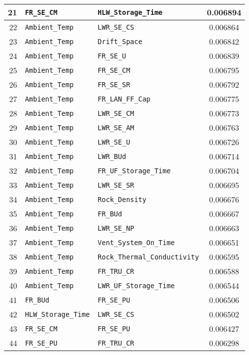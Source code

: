 \begin{center}
\begin{table}[htbp]
\begin{center}
\begin{tabular}{|r|l|l|c|}
\hline
21&\texttt{FR\_SE\_CM}&\texttt{HLW\_Storage\_Time}&0.006894\\
\hline
22&\texttt{Ambient\_Temp}&\texttt{LWR\_SE\_CS}&0.006864\\
\hline
23&\texttt{Ambient\_Temp}&\texttt{Drift\_Space}&0.006842\\
\hline
24&\texttt{Ambient\_Temp}&\texttt{FR\_SE\_U}&0.006839\\
\hline
25&\texttt{Ambient\_Temp}&\texttt{FR\_SE\_CM}&0.006795\\
\hline
26&\texttt{Ambient\_Temp}&\texttt{FR\_SE\_SR}&0.006792\\
\hline
27&\texttt{Ambient\_Temp}&\texttt{FR\_LAN\_FF\_Cap}&0.006775\\
\hline
28&\texttt{Ambient\_Temp}&\texttt{LWR\_SE\_CM}&0.006773\\
\hline
29&\texttt{Ambient\_Temp}&\texttt{LWR\_SE\_AM}&0.006763\\
\hline
30&\texttt{Ambient\_Temp}&\texttt{LWR\_SE\_U}&0.006726\\
\hline
31&\texttt{Ambient\_Temp}&\texttt{LWR\_BUd}&0.006714\\
\hline
32&\texttt{Ambient\_Temp}&\texttt{FR\_UF\_Storage\_Time}&0.006704\\
\hline
33&\texttt{Ambient\_Temp}&\texttt{LWR\_SE\_SR}&0.006695\\
\hline
34&\texttt{Ambient\_Temp}&\texttt{Rock\_Density}&0.006676\\
\hline
35&\texttt{Ambient\_Temp}&\texttt{FR\_BUd}&0.006667\\
\hline
36&\texttt{Ambient\_Temp}&\texttt{LWR\_SE\_NP}&0.006663\\
\hline
37&\texttt{Ambient\_Temp}&\texttt{Vent\_System\_On\_Time}&0.006651\\
\hline
38&\texttt{Ambient\_Temp}&\texttt{Rock\_Thermal\_Conductivity}&0.006595\\
\hline
39&\texttt{Ambient\_Temp}&\texttt{FR\_TRU\_CR}&0.006588\\
\hline
40&\texttt{Ambient\_Temp}&\texttt{LWR\_UF\_Storage\_Time}&0.006544\\
\hline
41&\texttt{FR\_BUd}&\texttt{FR\_SE\_PU}&0.006506\\
\hline
42&\texttt{HLW\_Storage\_Time}&\texttt{LWR\_SE\_CS}&0.006502\\
\hline
43&\texttt{FR\_SE\_CM}&\texttt{FR\_SE\_PU}&0.006427\\
\hline
44&\texttt{FR\_SE\_PU}&\texttt{FR\_TRU\_CR}&0.006298\\
\hline
\end{tabular}
\end{center}
\end{table}
\end{center}

